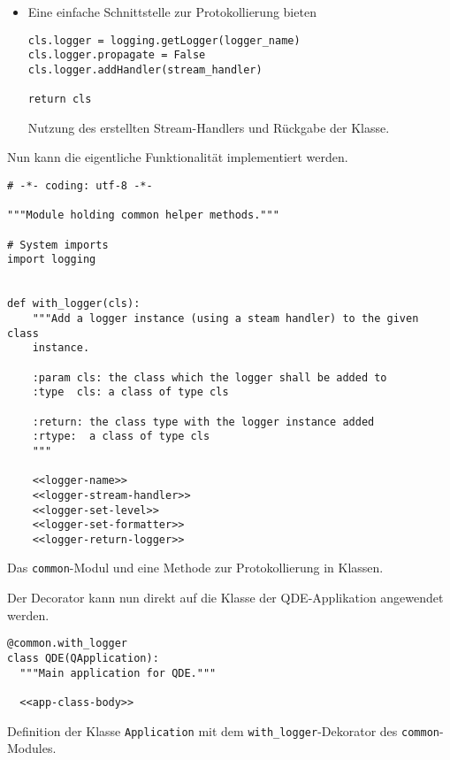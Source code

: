 \documentclass[10pt, openright, notitlepage]{scrreprt}
\begin{document}
\begin{itemize}
\item Eine einfache Schnittstelle zur Protokollierung bieten
\begin{listing}[H]
\begin{verbatim}
cls.logger = logging.getLogger(logger_name)
cls.logger.propagate = False
cls.logger.addHandler(stream_handler)

return cls
\end{verbatim}
\caption{\label{org3f57ab3}
Nutzung des erstellten Stream-Handlers und Rückgabe der Klasse.}
\end{listing}
\end{itemize}

Nun kann die eigentliche Funktionalität implementiert werden.

\begin{listing}[H]
\begin{verbatim}
# -*- coding: utf-8 -*-

"""Module holding common helper methods."""

# System imports
import logging


def with_logger(cls):
    """Add a logger instance (using a steam handler) to the given class
    instance.

    :param cls: the class which the logger shall be added to
    :type  cls: a class of type cls

    :return: the class type with the logger instance added
    :rtype:  a class of type cls
    """

    <<logger-name>>
    <<logger-stream-handler>>
    <<logger-set-level>>
    <<logger-set-formatter>>
    <<logger-return-logger>>
\end{verbatim}
\caption{\label{orgd9a8781}
Das \texttt{common}-Modul und eine Methode zur Protokollierung in Klassen.}
\end{listing}


Der Decorator kann nun direkt auf die Klasse der QDE-Applikation angewendet
werden.

\begin{listing}[H]
\begin{verbatim}
@common.with_logger
class QDE(QApplication):
  """Main application for QDE."""

  <<app-class-body>>
\end{verbatim}
\caption{\label{org627e224}
Definition der Klasse \texttt{Application} mit dem \texttt{with\_logger}-Dekorator des \texttt{common}-Modules.}
\end{listing}
\end{document}
